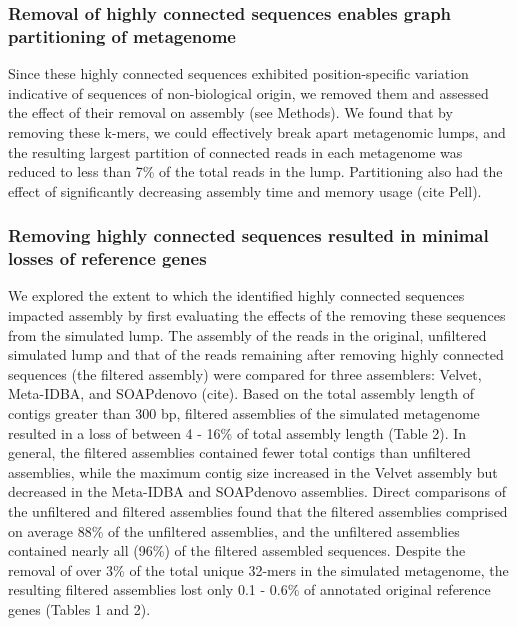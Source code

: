 \documentclass[10pt]{article}
\begin{document}
\subsubsection*{Removal of highly connected sequences enables graph partitioning of metagenome}

Since these highly connected sequences exhibited position-specific
variation indicative of sequences of non-biological origin, we removed
them and assessed the effect of their removal on assembly (see
Methods).  We found that by removing these k-mers, we could
effectively break apart metagenomic lumps, and the resulting largest
partition of connected reads in each metagenome was reduced to less
than 7\% of the total reads in the lump.  Partitioning also had the
effect of significantly decreasing assembly time and memory usage
(cite Pell).

\subsubsection*{Removing highly connected sequences resulted in minimal losses of reference genes}

We explored the extent
to which the identified highly connected
sequences impacted assembly by first evaluating the effects of the
removing these sequences from the simulated lump.  The assembly of the reads in the original,
unfiltered simulated lump and that of the reads remaining after
removing highly connected sequences (the filtered assembly) were
compared for three assemblers: Velvet, Meta-IDBA, and SOAPdenovo (cite).
Based on the total assembly length of contigs greater than 300 bp,
filtered assemblies of the simulated metagenome resulted in a loss of
between 4 - 16\% of total assembly length (Table 2).  In general, the
filtered assemblies contained fewer total contigs than unfiltered
assemblies, while the maximum contig size increased in the Velvet
assembly but decreased in the Meta-IDBA and SOAPdenovo assemblies.
Direct comparisons of the unfiltered and filtered assemblies found
that the filtered assemblies comprised on average 88\% of the
unfiltered assemblies, and the unfiltered assemblies contained nearly
all (96\%) of the filtered assembled sequences.  Despite the removal
of over 3\% of the total unique 32-mers in the simulated metagenome,
the resulting filtered assemblies lost only 0.1 -
0.6\% of annotated original reference genes (Tables 1 and 2).
\end{document}
